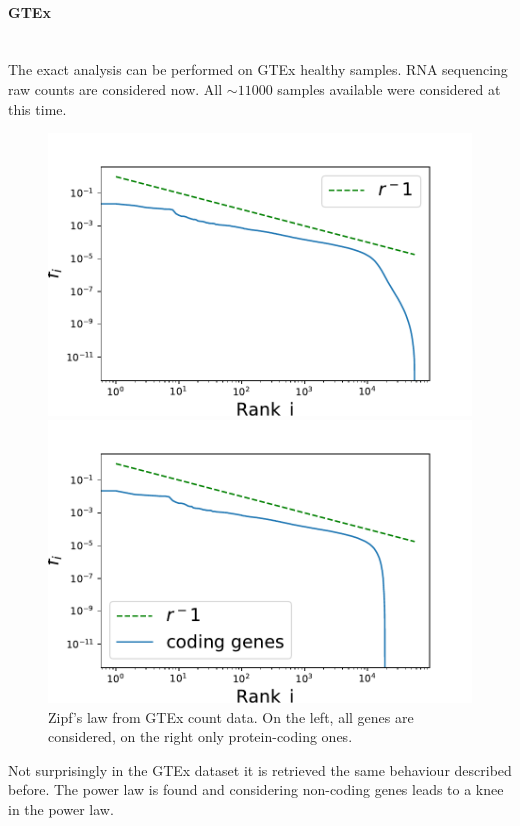 \paragraph{GTEx}\mbox{} \\
The exact analysis can be performed on GTEx healthy samples. RNA sequencing raw counts are considered now. All $\sim11000$ samples available were considered at this time.
\begin{figure}[htb!]
    \centering
    \begin{minipage}{0.45\textwidth}
    \includegraphics[width=0.95\linewidth]{pictures/structure/gtex/globalZipf.pdf}
    \end{minipage}
    \hspace{2mm}
    \begin{minipage}{0.45\textwidth}
    \includegraphics[width=0.95\linewidth]{pictures/structure/gtex/globalZipf_c.pdf}
    \end{minipage}
    \caption{Zipf's law from GTEx count data. On the left, all genes are considered, on the right only protein-coding ones.}
    \label{fig:my_label}
\end{figure}
Not surprisingly in the GTEx dataset it is retrieved the same behaviour described before. The power law is found and considering non-coding genes leads to a knee in the power law.

